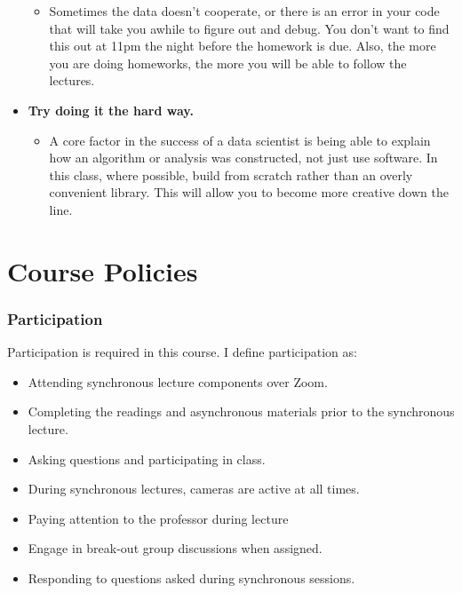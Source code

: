 \documentclass[
  12pt,
]{article}
\providecommand{\tightlist}{%
  \setlength{\itemsep}{0pt}\setlength{\parskip}{0pt}}
\begin{document}
\begin{itemize}
  \begin{itemize}
  \tightlist
  \item
    Sometimes the data doesn't cooperate, or there is an error in your
    code that will take you awhile to figure out and debug. You don't
    want to find this out at 11pm the night before the homework is due.
    Also, the more you are doing homeworks, the more you will be able to
    follow the lectures.
  \end{itemize}
\item
  \textbf{Try doing it the hard way.}

  \begin{itemize}
  \tightlist
  \item
    A core factor in the success of a data scientist is being able to
    explain how an algorithm or analysis was constructed, not just use
    software. In this class, where possible, build from scratch rather
    than an overly convenient library. This will allow you to become
    more creative down the line.
  \end{itemize}
\end{itemize}

\hypertarget{course-policies}{%
\section{Course Policies}\label{course-policies}}

\hypertarget{participation}{%
\subsubsection{Participation}\label{participation}}

Participation is required in this course. I define participation as:

\begin{itemize}
\tightlist
\item
  Attending synchronous lecture components over Zoom.
\item
  Completing the readings and asynchronous materials prior to the
  synchronous lecture.
\item
  Asking questions and participating in class.
\item
  During synchronous lectures, cameras are active at all times.
\item
  Paying attention to the professor during lecture
\item
  Engage in break-out group discussions when assigned.
\item
  Responding to questions asked during synchronous sessions.
\end{itemize}
\end{document}
